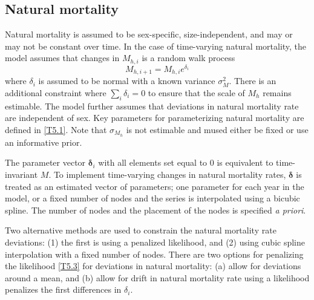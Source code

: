 \documentclass[12pt,letterpaper]{article}
\begin{document}

    \subsection*{Natural mortality} %
    \label{sub:natural_mortality}
    Natural mortality is assumed to be sex-specific, size-independent, and may or may not be constant over time.  In the case of time-varying natural mortality, the model assumes that changes in $M_{h,i}$ is a random walk process 
    \[M_{h,i+1} = M_{h,i} e^{\delta_{i}}\]
    where $\delta_i$ is assumed to be normal with a known variance $\sigma^2_M$. There is an additional constraint where $\sum_i \delta_i = 0$ to ensure that the scale of $M_h$ remains estimable. The model further assumes that deviations in natural mortality rate are independent of sex.  Key parameters for parameterizing natural mortality are defined in \eqref{T5.1}.  Note that $\sigma_{M_h}$ is not estimable and mused either be fixed or use an informative prior.

    The parameter vector $\bm{\delta}_i$ with all elements set equal to 0 is equivalent to time-invariant $M$. To implement time-varying changes in natural mortality rates,  $\bm{\delta}$ is treated as an estimated vector of parameters; one parameter for each year in the model, or a fixed number of nodes and the series is interpolated using a bicubic spline. The number of nodes and the placement of the nodes is specified \emph{a priori}.

    Two alternative methods are used to constrain the natural mortality rate deviations: (1) the first is using a penalized likelihood, and (2) using cubic spline interpolation with a fixed number of nodes. There are two options for penalizing the likelihood \eqref{T5.3} for deviations in natural mortality: (a) allow for deviations around a mean, and (b) allow for drift in natural mortality rate using a likelihood penalizes the first differences in $\delta_i$.
\end{document}

